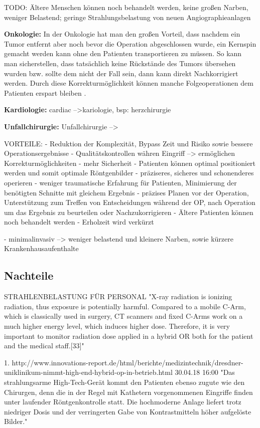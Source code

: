 TODO: Ältere Menschen können noch behandelt werden, keine großen Narben, weniger Belastend; geringe Strahlungsbelastung von neuen Angiographieanlagen 
 
\textbf{Onkologie:}
In der Onkologie hat man den großen Vorteil, dass nachdem ein Tumor entfernt aber noch bevor die Operation abgeschlossen wurde, ein Kernspin gemacht werden kann ohne den Patienten transportieren zu müssen. So kann man sicherstellen, dass tatsächlich keine Rückstände des Tumors übersehen wurden bzw. sollte dem nicht der Fall sein, dann kann direkt Nachkorrigiert werden. Durch diese Korrekturmöglichkeit können manche Folgeoperationen dem Patienten erspart bleiben \cite{AerzteZeitung}.

\textbf{Kardiologie:}
cardiac -->kariologie, bsp: herzchirurgie

\textbf{Unfallchirurgie:}
Unfallchirurgie -->

VORTEILE:
- Reduktion der Komplexität, Bypass Zeit und Risiko  sowie bessere Operationsergebnisse
- Qualitätskontrollen währen Eingriff --> ermöglichen Korrekturmöglichkeiten
- mehr Sicherheit
- Patienten können optimal positioniert werden und somit optimale Röntgenbilder
- präziseres, sicheres und schonenderes operieren
- weniger traumatische Erfahrung für Patienten, Minimierung der benötigten Schnitte mit gleichem Ergebnis
- präzises Planen vor der Operation, Unterstützung zum Treffen von Entscheidungen während der OP, nach Operation um das Ergebnis zu beurteilen oder Nachzukorrigieren
- Ältere Patienten können noch behandelt werden
- Erholzeit wird verkürzt

- minimalinvasiv --> weniger belastend und kleinere Narben, sowie kürzere Krankenhausaufenthalte

\subsection{Nachteile}

STRAHLENBELASTUNG FÜR PERSONAL
"X-ray radiation is ionizing radiation, thus exposure is potentially harmful. Compared to a mobile C-Arm, which is classically used in surgery, CT scanners and fixed C-Arms work on a much higher energy level, which induces higher dose. Therefore, it is very important to monitor radiation dose applied in a hybrid OR both for the patient and the medical staff.[33]"

1. http://www.innovations-report.de/html/berichte/medizintechnik/dresdner-uniklinikum-nimmt-high-end-hybrid-op-in-betrieb.html	 30.04.18 16:00
"Das strahlungsarme High-Tech-Gerät kommt den Patienten ebenso zugute wie den Chirurgen, denn die in der Regel mit Kathetern vorgenommenen Eingriffe finden unter laufender Röntgenkontrolle statt. Die hochmoderne Anlage liefert trotz niedriger Dosis und der verringerten Gabe von Kontrastmitteln höher aufgelöste Bilder."


